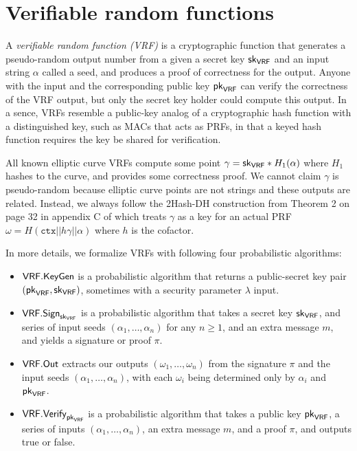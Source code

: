 \section{Verifiable random functions}
\label{sec:VRFs}


A {\em verifiable random function (VRF)} is a cryptographic function that generates a pseudo-random output number from a given a secret key $\mathsf{sk}_{\mathsf{VRF}}$ and an input string $\alpha$ called a seed, and produces a proof of correctness for the output.  Anyone with the input and the corresponding public key $\mathsf{pk}_{\mathsf{VRF}}$ can verify the correctness of the VRF output, but only the secret key holder could compute this output.  In a sence, VRFs resemble a public-key analog of a cryptographic hash function with a distinguished key, such as MACs that acts as PRFs, in that a keyed hash function requires the key be shared for verification. 

All known elliptic curve VRFs compute some point $\gamma = \mathsf{sk}_{\mathsf{VRF}} * H_1(\alpha)$ where $H_1$ hashes to the curve, and provides some correctness proof.  We cannot claim $\gamma$ is pseudo-random because elliptic curve points are not strings and these outputs are related.  Instead, we always follow the 2Hash-DH construction from Theorem 2 on page 32 in appendix C of \cite{Praos} which treats $\gamma$ as a key for an actual PRF $\omega = H(\mathtt{ctx} || h \gamma || \alpha)$ where $h$ is the cofactor.  

In more details, we formalize VRFs with following four probabilistic algorithms: 
\begin{itemize}
\item $\mathsf{VRF}.\mathsf{KeyGen}$ is a probabilistic algorithm that returns a public-secret key pair $(\mathsf{pk}_{\mathsf{VRF}},\mathsf{sk}_{\mathsf{VRF}})$, sometimes with a security parameter $\lambda$ input.
\item $\mathsf{VRF}.\mathsf{Sign}_{\mathsf{sk}_{\mathsf{VRF}}}$ is a probabilistic algorithm that takes a secret key $\mathsf{sk}_{\mathsf{VRF}}$, and series of input seeds $(\alpha_1,\ldots,\alpha_n)$ for any $n\ge1$, and an extra message $m$, and yields a signature or proof $\pi$. 
\item $\mathsf{VRF}.\mathsf{Out}$ extracts our outputs $(\omega_1,\ldots,\omega_n)$ from the signature $\pi$ and the input seeds $(\alpha_1,\ldots,\alpha_n)$, with each $\omega_i$ being determined only by $\alpha_i$ and $\mathsf{pk}_{\mathsf{VRF}}$.
\item $\mathsf{VRF}.\mathsf{Verify}_{\mathsf{pk}_{\mathsf{VRF}}}$ is a probabilistic algorithm that takes a public key $\mathsf{pk}_{\mathsf{VRF}}$, a series of inputs $(\alpha_1,\ldots,\alpha_n)$, an extra message $m$, and a proof $\pi$, and outputs true or false.
\end{itemize}

